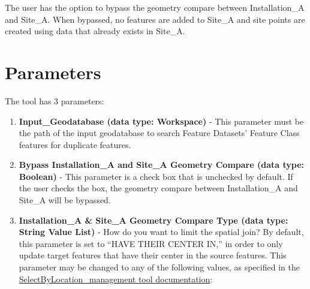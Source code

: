 \documentclass[openany]{book}
\providecommand{\tightlist}{%
  \setlength{\itemsep}{0pt}\setlength{\parskip}{0pt}}
\theoremstyle{definition}
\theoremstyle{definition}
\theoremstyle{definition}
\theoremstyle{remark}
\begin{document}
The user has the option to bypass the geometry compare between
Installation\_A and Site\_A. When bypassed, no features are added to
Site\_A and site points are created using data that already exists in
Site\_A.

\section{Parameters}\label{parameters}

The tool has 3 parameters:

\begin{enumerate}
\def\labelenumi{\arabic{enumi}.}
\tightlist
\item
  \textbf{Input\_Geodatabase (data type: Workspace)} - This parameter
  must be the path of the input geodatabase to search Feature Datasets'
  Feature Class features for duplicate features.\\
\item
  \textbf{Bypass Installation\_A and Site\_A Geometry Compare (data
  type: Boolean)} - This parameter is a check box that is unchecked by
  default. If the user checks the box, the geometry compare between
  Installation\_A and Site\_A will be bypassed.
\item
  \textbf{Installation\_A \& Site\_A Geometry Compare Type (data type:
  String Value List)} - How do you want to limit the spatial join? By
  default, this parameter is set to ``HAVE THEIR CENTER IN,'' in order
  to only update target features that have their center in the source
  features. This parameter may be changed to any of the following
  values, as specified in the
  \href{http://desktop.arcgis.com/en/arcmap/latest/tools/data-management-toolbox/select-layer-by-location.htm}{SelectByLocation\_management
  tool documentation}:


\end{enumerate}
\end{document}
